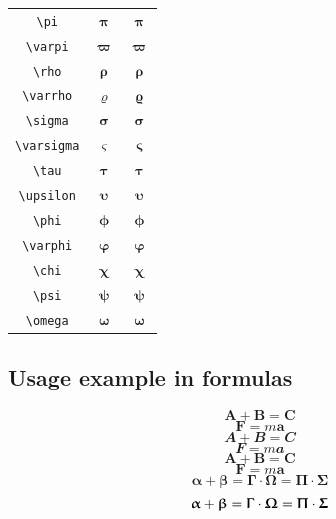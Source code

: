 \documentclass[12pt,a4paper]{article}
\begin{document}
\begin{longtable}{|c|c|c|}
\verb|\pi| & $\bm{\pi}$ & $\bm{\uppi}$ \\ %
\verb|\varpi| & $\bm{\varpi}$ & $\bm{\upvarpi}$ \\ %
\verb|\rho| & $\bm{\rho}$ & $\bm{\uprho}$ \\ %
\verb|\varrho| & $\bm{\varrho}$ & $\bm{\upvarrho}$ \\ %
\verb|\sigma| & $\bm{\sigma}$ & $\bm{\upsigma}$ \\ %
\verb|\varsigma| & $\bm{\varsigma}$ & $\bm{\upvarsigma}$ \\ %
\verb|\tau| & $\bm{\tau}$ & $\bm{\uptau}$ \\ %
\verb|\upsilon| & $\bm{\upsilon}$ & $\bm{\upupsilon}$ \\ %
\verb|\phi| & $\bm{\phi}$ & $\bm{\upphi}$ \\ %
\verb|\varphi| & $\bm{\varphi}$ & $\bm{\upvarphi}$ \\ %
\verb|\chi| & $\bm{\chi}$ & $\bm{\upchi}$ \\ %
\verb|\psi| & $\bm{\psi}$ & $\bm{\uppsi}$ \\ %
\verb|\omega| & $\bm{\omega}$ & $\bm{\upomega}$ \\ %
\hline
\end{longtable}

\newpage

\subsection*{Usage example in formulas}
\[
\mathbf{A} + \mathbf{B} = \mathbf{C}
\]
\[
\mathbf{F} = m \mathbf{a}
\]
\[
\mathbfit{A} + \mathbfit{B} = \mathbfit{C}
\]
\[
\mathbfit{F} = m \mathbfit{a}
\]
\[
\bm{A} + \bm{B} = \bm{C}
\]
\[
\bm{F} = m \bm{a}
\]
\[
\bm{\alpha} + \bm{\beta} = \bm{\Gamma} \cdot \bm{\Omega} = \bm{\Pi} \cdot \bm{\Sigma}
\]
\[
\bm{\upalpha} + \bm{\upbeta} = \bm{\Upgamma} \cdot \bm{\Upomega} = \bm{\Uppi} \cdot \bm{\Upsigma}
\]
\end{document}
